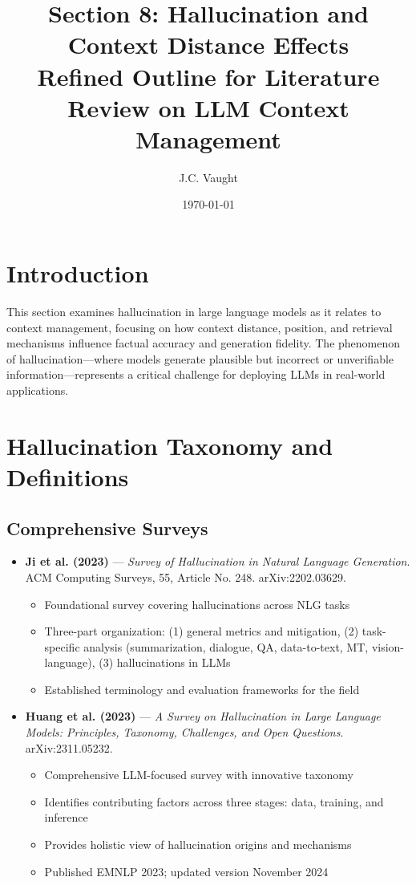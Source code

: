 \documentclass[11pt,letterpaper]{article}
\title{\textbf{\Large Section 8: Hallucination and Context Distance Effects}\\
\large Refined Outline for Literature Review on LLM Context Management}
\author{J.C. Vaught}
\date{\today}
\begin{document}
\maketitle

\section{Introduction}

This section examines hallucination in large language models as it relates to context management, focusing on how context distance, position, and retrieval mechanisms influence factual accuracy and generation fidelity. The phenomenon of hallucination---where models generate plausible but incorrect or unverifiable information---represents a critical challenge for deploying LLMs in real-world applications.

\section{Hallucination Taxonomy and Definitions}

\subsection{Comprehensive Surveys}

\begin{itemize}[leftmargin=*]
\item \textbf{Ji et al. (2023)} --- \textit{Survey of Hallucination in Natural Language Generation}. ACM Computing Surveys, 55, Article No. 248. arXiv:2202.03629.
  \begin{itemize}
  \item Foundational survey covering hallucinations across NLG tasks
  \item Three-part organization: (1) general metrics and mitigation, (2) task-specific analysis (summarization, dialogue, QA, data-to-text, MT, vision-language), (3) hallucinations in LLMs
  \item Established terminology and evaluation frameworks for the field
  \end{itemize}

\item \textbf{Huang et al. (2023)} --- \textit{A Survey on Hallucination in Large Language Models: Principles, Taxonomy, Challenges, and Open Questions}. arXiv:2311.05232.
  \begin{itemize}
  \item Comprehensive LLM-focused survey with innovative taxonomy
  \item Identifies contributing factors across three stages: data, training, and inference
  \item Provides holistic view of hallucination origins and mechanisms
  \item Published EMNLP 2023; updated version November 2024
  \end{itemize}
\end{itemize}
\end{document}
